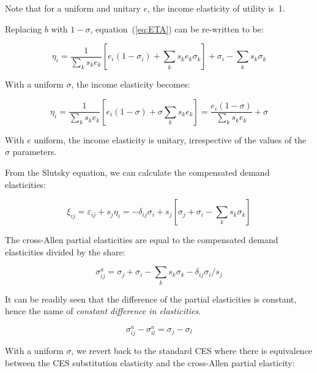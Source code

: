 \noindent Note that for a uniform and unitary $e$, the income elasticity of utility is~1.

\noindent Replacing $b$ with $1-\sigma$, equation~(\ref{eq:ETA}) can be re-written to be:

\begin{equation}
\label{eq:ETAS}
{\eta_i} = \frac{1}{{\sum\limits_k {{s_k}{e_k}} }}\left[ {{e_i}(1 - {\sigma_i})
+ \sum\limits_k {{s_k}{e_k}{\sigma_k}} } \right] + {\sigma_i} - \sum\limits_k {{s_k}{\sigma_k}}
\end{equation}

\noindent With a uniform $\sigma$, the income elasticity becomes:

\begin{equation}
{\eta_i} = \frac{1}{{\sum\limits_k {{s_k}{e_k}} }}\left[ {{e_i}(1 - \sigma )
+ \sigma \sum\limits_k {{s_k}{e_k}} } \right] = \frac{{{e_i}(1 - \sigma )}}
{{\sum\limits_k {{s_k}{e_k}} }} + \sigma
\end{equation}

\noindent With $e$ uniform, the income elasticity is unitary, irrespective of the values of
the $\sigma$ parameters.

From the Slutsky equation, we can calculate the compensated demand elasticities:

\begin{equation}
{\xi_{ij}} = {\varepsilon_{ij}} + {s_j}{\eta_i} =  - {\delta_{ij}}{\sigma_i}
+ {s_j}\left[ {{\sigma_j} + {\sigma_i} - \sum\limits_k {{s_k}{\sigma_k}} } \right]
\end{equation}

\noindent The cross-Allen partial elasticities are equal to the compensated demand
elasticities divided by the share:

\begin{equation}
\label{eq:APE}
\sigma_{ij}^a = {\sigma_j} + {\sigma_i} - \sum\limits_k {{s_k}{\sigma_k}}
- {\delta_{ij}}{\sigma_i}/{s_j}
\end{equation}

\noindent It can be readily seen that the difference of the partial elasticities is constant,
hence the name of \emph{constant difference in elasticities}.

\begin{equation}
\sigma_{ij}^a - \sigma_{il}^a = {\sigma_j} - {\sigma_l}
\end{equation}

\noindent With a uniform $\sigma$, we revert back to the standard CES where there is equivalence
between the CES substitution elasticity and the cross-Allen partial elasticity:

